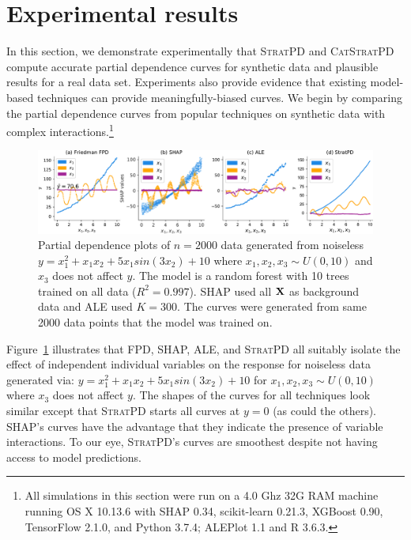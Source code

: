 \documentclass[]{article} %
\newcommand{\figref}[1]{Figure~\ref{#1}}
\newcommand{\spd}{\fontfamily{cmr}\textsc{\small StratPD}}
\newcommand{\cspd}{\fontfamily{cmr}\textsc{\small CatStratPD}}
\begin{document}
\section{Experimental results}\label{sec:experiments} 

In this section, we demonstrate experimentally that \spd{} and \cspd{} compute accurate partial dependence curves for synthetic data and plausible results for a real data set. Experiments also provide evidence that existing model-based techniques can provide meaningfully-biased curves. We begin by comparing the partial dependence curves from popular techniques on synthetic data with complex interactions.\footnote{All simulations in this section were run on a 4.0 Ghz 32G RAM machine running OS X 10.13.6 with SHAP 0.34, scikit-learn 0.21.3, XGBoost 0.90, TensorFlow 2.1.0, and Python 3.7.4; ALEPlot 1.1 and R 3.6.3.}

\begin{figure}[!htbp]
\begin{center}
\includegraphics[scale=0.41]{images/interactions.pdf}\vspace{-2mm}
\caption{\small  Partial dependence plots of $n=2000$ data generated from noiseless $y = x_1^2 + x_1 x_2 + 5 x_1 sin(3 x_2) + 10$ where $x_1,x_2,x_3 \sim U(0,10)$ and $x_3$ does not affect $y$. The model is a random forest with 10 trees trained on all data ($R^2=0.997$). SHAP used all $\bf X$ as background data and ALE used $K=300$. The curves were generated from same 2000 data points that the model was trained on.}
\label{fig:interactions}
\end{center}
\end{figure}

\figref{fig:interactions} illustrates that FPD, SHAP, ALE, and \spd{} all suitably isolate the effect of independent individual variables on the response for noiseless data generated via: $y = x_1^2 + x_1 x_2 + 5 x_1 sin(3 x_2) + 10$ for $x_1,x_2,x_3 \sim U(0,10)$ where $x_3$ does not affect $y$. The shapes of the curves for all techniques look similar except that \spd{} starts all curves at $y=0$ (as could the others). SHAP's curves have the advantage that they indicate the presence of variable interactions. To our eye, \spd's curves are smoothest despite not having access to model predictions.
\end{document}
